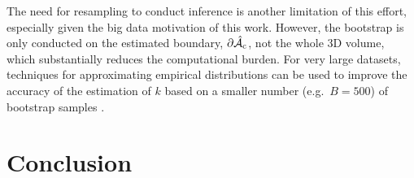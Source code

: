 The need for resampling to conduct inference is another limitation of this effort, especially given the big data motivation of this work.  However, the bootstrap  is only conducted on the estimated boundary, $\operatorname{\partial\hat{\mathcal{A}}_{c}}$, not the whole 3D volume, which substantially reduces the computational burden.  For very large datasets, techniques for approximating empirical distributions can be used to improve the accuracy of the estimation of $k$ based on a smaller number (e.g.~$B=500$) of bootstrap samples \citep{Winkler2016-mw}.

\section{Conclusion}
